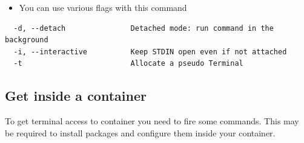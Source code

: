 \documentclass[11pt]{article}
\begin{document}
\begin{itemize}
\item You can use various flags with this command
\end{itemize}
\begin{verbatim}
  -d, --detach               Detached mode: run command in the background
  -i, --interactive          Keep STDIN open even if not attached
  -t                         Allocate a pseudo Terminal
\end{verbatim}
\subsection{Get inside a container}
\label{sec:orgheadline17}
To get terminal access to container you need to fire some commands. This may be
required to install packages and configure them inside your container.
\end{document}
